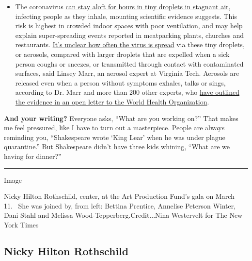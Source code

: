 \begin{itemize}
  \begin{itemize}
  \tightlist
  \item
    The coronavirus
    \href{https://www.nytimes.com/2020/07/04/health/239-experts-with-one-big-claim-the-coronavirus-is-airborne.html?action=click\&pgtype=Article\&state=default\&region=MAIN_CONTENT_3\&context=storylines_faq}{can
    stay aloft for hours in tiny droplets in stagnant air}, infecting
    people as they inhale, mounting scientific evidence suggests. This
    risk is highest in crowded indoor spaces with poor ventilation, and
    may help explain super-spreading events reported in meatpacking
    plants, churches and restaurants.
    \href{https://www.nytimes.com/2020/07/06/health/coronavirus-airborne-aerosols.html?action=click\&pgtype=Article\&state=default\&region=MAIN_CONTENT_3\&context=storylines_faq}{It's
    unclear how often the virus is spread} via these tiny droplets, or
    aerosols, compared with larger droplets that are expelled when a
    sick person coughs or sneezes, or transmitted through contact with
    contaminated surfaces, said Linsey Marr, an aerosol expert at
    Virginia Tech. Aerosols are released even when a person without
    symptoms exhales, talks or sings, according to Dr. Marr and more
    than 200 other experts, who
    \href{https://academic.oup.com/cid/article/doi/10.1093/cid/ciaa939/5867798}{have
    outlined the evidence in an open letter to the World Health
    Organization}.
  \end{itemize}
\end{itemize}

\textbf{And your writing?} Everyone asks, ``What are you working on?''
That makes me feel pressured, like I have to turn out a masterpiece.
People are always reminding you, ``Shakespeare wrote `King Lear' when he
was under plague quarantine.'' But Shakespeare didn't have three kids
whining, ``What are we having for dinner?''

\begin{center}\rule{0.5\linewidth}{\linethickness}\end{center}

Image

Nicky Hilton Rothschild, center, at the Art Production Fund's gala on
March 11.~ She was joined by, from left: Bettina Prentice, Annelise
Peterson Winter, Dani Stahl and Melissa Wood-Tepperberg.Credit...Nina
Westervelt for The New York Times

\hypertarget{nicky-hilton-rothschild}{%
\subsection{Nicky Hilton Rothschild}\label{nicky-hilton-rothschild}}

